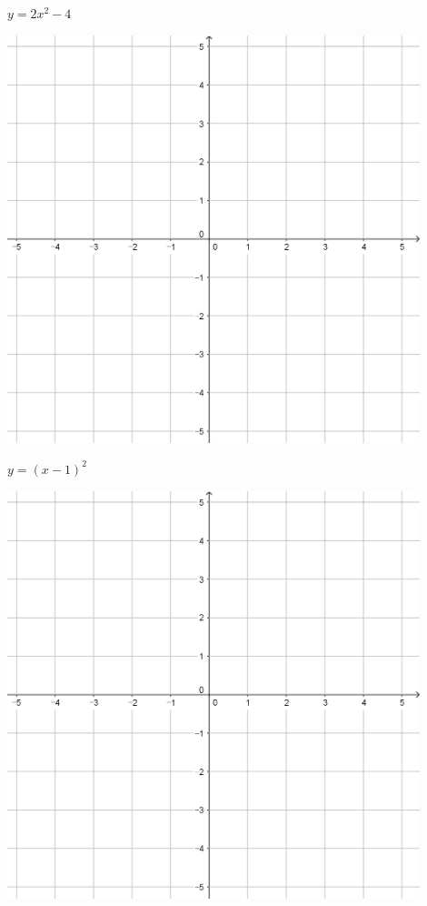 \documentclass[a4paper]{oblivoir}
\begin{document}
\begin{minipage}{0.45\textwidth}\centering
\(y=2x^2-4\)
\par\bigskip\includegraphics[width=0.9\textwidth]{55}
\end{minipage}
\begin{minipage}{0.45\textwidth}\centering
\(y=(x-1)^2\)
\par\bigskip\includegraphics[width=0.9\textwidth]{55}
\end{minipage}\bigskip\bigskip\par
\end{document}
